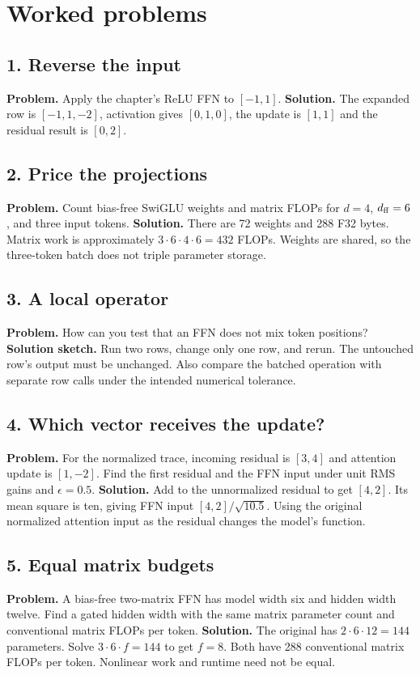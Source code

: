 \section{Worked problems}
\subsection*{1. Reverse the input}
\textbf{Problem.} Apply the chapter's ReLU FFN to $[-1,1]$.
\textbf{Solution.} The expanded row is $[-1,1,-2]$, activation gives
$[0,1,0]$, the update is $[1,1]$ and the residual result is $[0,2]$.
\subsection*{2. Price the projections}
\textbf{Problem.} Count bias-free SwiGLU weights and matrix FLOPs for
$d=4$, $d_{\rm ff}=6$, and three input tokens.
\textbf{Solution.} There are 72 weights and 288 F32 bytes.
Matrix work is approximately $3\cdot6\cdot4\cdot6=432$ FLOPs.
Weights are shared, so the three-token batch does not triple parameter storage.
\subsection*{3. A local operator}
\textbf{Problem.} How can you test that an FFN does not mix token positions?
\textbf{Solution sketch.} Run two rows, change only one row, and rerun.
The untouched row's output must be unchanged. Also compare the batched
operation with separate row calls under the intended numerical tolerance.
\subsection*{4. Which vector receives the update?}
\textbf{Problem.} For the normalized trace, incoming residual is $[3,4]$
and attention update is $[1,-2]$. Find the first residual and the FFN
input under unit RMS gains and $\epsilon=0.5$.
\textbf{Solution.} Add to the unnormalized residual to get $[4,2]$.
Its mean square is ten, giving FFN input $[4,2]/\sqrt{10.5}$.
Using the original normalized attention input as the residual changes
the model's function.
\subsection*{5. Equal matrix budgets}
\textbf{Problem.} A bias-free two-matrix FFN has model width six and hidden
width twelve. Find a gated hidden width with the same matrix parameter
count and conventional matrix FLOPs per token.
\textbf{Solution.} The original has $2\cdot6\cdot12=144$ parameters.
Solve $3\cdot6\cdot f=144$ to get $f=8$. Both have 288 conventional
matrix FLOPs per token. Nonlinear work and runtime need not be equal.
